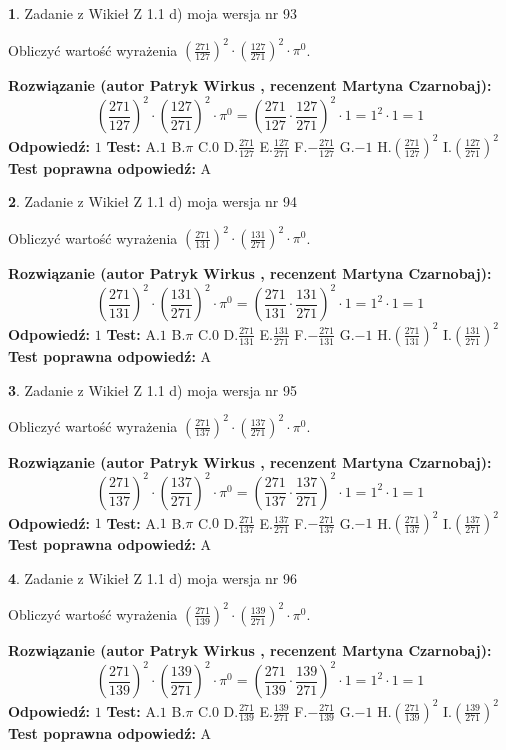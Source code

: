 \documentclass[12pt, a4paper]{article}
\theoremstyle{definition} %
\newtheorem{zad}{}
\newcommand{\zadStart}[1]{\begin{zad}#1\newline}
\newcommand{\zadStop}{\end{zad}}
\newcommand{\rozwStart}[2]{\noindent \textbf{Rozwiązanie (autor #1 , recenzent #2): }\newline}
\newcommand{\rozwStop}{\newline}
\newcommand{\odpStart}{\noindent \textbf{Odpowiedź:}\newline}
\newcommand{\odpStop}{\newline}
\newcommand{\testStart}{\noindent \textbf{Test:}\newline}
\newcommand{\testStop}{\newline}
\newcommand{\kluczStart}{\noindent \textbf{Test poprawna odpowiedź:}\newline}
\newcommand{\kluczStop}{\newline}
\begin{document}
\zadStart{Zadanie z Wikieł Z 1.1 d) moja wersja nr 93}

Obliczyć wartość wyrażenia $(\frac{271}{127})^{2} \cdot (\frac{127}{271})^{2} \cdot \pi^{0}$.
\zadStop
\rozwStart{Patryk Wirkus}{Martyna Czarnobaj}
$$(\frac{271}{127})^{2} \cdot (\frac{127}{271})^{2} \cdot \pi^{0} = (\frac{271}{127} \cdot \frac{127}{271})^{2} \cdot 1 = 1^{2} \cdot 1 = 1$$
\rozwStop
\odpStart
$1$
\odpStop
\testStart
A.$1$ B.$\pi$ C.$0$ D.$\frac{271}{127}$ E.$\frac{127}{271}$
F.$-\frac{271}{127}$ G.$-1$
H.$(\frac{271}{127})^{2}$
I.$(\frac{127}{271})^{2}$
\testStop
\kluczStart
A
\kluczStop



\zadStart{Zadanie z Wikieł Z 1.1 d) moja wersja nr 94}

Obliczyć wartość wyrażenia $(\frac{271}{131})^{2} \cdot (\frac{131}{271})^{2} \cdot \pi^{0}$.
\zadStop
\rozwStart{Patryk Wirkus}{Martyna Czarnobaj}
$$(\frac{271}{131})^{2} \cdot (\frac{131}{271})^{2} \cdot \pi^{0} = (\frac{271}{131} \cdot \frac{131}{271})^{2} \cdot 1 = 1^{2} \cdot 1 = 1$$
\rozwStop
\odpStart
$1$
\odpStop
\testStart
A.$1$ B.$\pi$ C.$0$ D.$\frac{271}{131}$ E.$\frac{131}{271}$
F.$-\frac{271}{131}$ G.$-1$
H.$(\frac{271}{131})^{2}$
I.$(\frac{131}{271})^{2}$
\testStop
\kluczStart
A
\kluczStop



\zadStart{Zadanie z Wikieł Z 1.1 d) moja wersja nr 95}

Obliczyć wartość wyrażenia $(\frac{271}{137})^{2} \cdot (\frac{137}{271})^{2} \cdot \pi^{0}$.
\zadStop
\rozwStart{Patryk Wirkus}{Martyna Czarnobaj}
$$(\frac{271}{137})^{2} \cdot (\frac{137}{271})^{2} \cdot \pi^{0} = (\frac{271}{137} \cdot \frac{137}{271})^{2} \cdot 1 = 1^{2} \cdot 1 = 1$$
\rozwStop
\odpStart
$1$
\odpStop
\testStart
A.$1$ B.$\pi$ C.$0$ D.$\frac{271}{137}$ E.$\frac{137}{271}$
F.$-\frac{271}{137}$ G.$-1$
H.$(\frac{271}{137})^{2}$
I.$(\frac{137}{271})^{2}$
\testStop
\kluczStart
A
\kluczStop



\zadStart{Zadanie z Wikieł Z 1.1 d) moja wersja nr 96}

Obliczyć wartość wyrażenia $(\frac{271}{139})^{2} \cdot (\frac{139}{271})^{2} \cdot \pi^{0}$.
\zadStop
\rozwStart{Patryk Wirkus}{Martyna Czarnobaj}
$$(\frac{271}{139})^{2} \cdot (\frac{139}{271})^{2} \cdot \pi^{0} = (\frac{271}{139} \cdot \frac{139}{271})^{2} \cdot 1 = 1^{2} \cdot 1 = 1$$
\rozwStop
\odpStart
$1$
\odpStop
\testStart
A.$1$ B.$\pi$ C.$0$ D.$\frac{271}{139}$ E.$\frac{139}{271}$
F.$-\frac{271}{139}$ G.$-1$
H.$(\frac{271}{139})^{2}$
I.$(\frac{139}{271})^{2}$
\testStop
\kluczStart
A
\kluczStop
\end{document}
